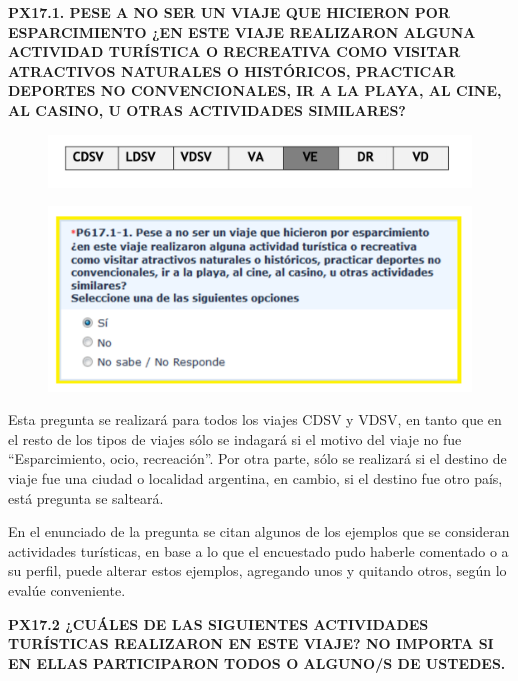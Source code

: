 \documentclass[
  openany]{book}
\begin{document}
\textbf{PX17.1. PESE A NO SER UN VIAJE QUE HICIERON POR ESPARCIMIENTO ¿EN ESTE VIAJE REALIZARON ALGUNA ACTIVIDAD TURÍSTICA O RECREATIVA COMO VISITAR ATRACTIVOS NATURALES O HISTÓRICOS, PRACTICAR DEPORTES NO CONVENCIONALES, IR A LA PLAYA, AL CINE, AL CASINO, U OTRAS ACTIVIDADES SIMILARES?}

\begin{figure}

{\centering \includegraphics[width=1\linewidth]{imagenes/figura6-111} 

}

\end{figure}

\begin{figure}

{\centering \includegraphics[width=1\linewidth]{imagenes/figura6-112} 

}

\end{figure}

Esta pregunta se realizará para todos los viajes CDSV y VDSV, en tanto que en el resto de los tipos de viajes sólo se indagará si el motivo del viaje no fue ``Esparcimiento, ocio, recreación''. Por otra parte, sólo se realizará si el destino de viaje fue una ciudad o localidad argentina, en cambio, si el destino fue otro país, está pregunta se salteará.

En el enunciado de la pregunta se citan algunos de los ejemplos que se consideran actividades turísticas, en base a lo que el encuestado pudo haberle comentado o a su perfil, puede alterar estos ejemplos, agregando unos y quitando otros, según lo evalúe conveniente.

\textbf{PX17.2 ¿CUÁLES DE LAS SIGUIENTES ACTIVIDADES TURÍSTICAS REALIZARON EN ESTE VIAJE? NO IMPORTA SI EN ELLAS PARTICIPARON TODOS O ALGUNO/S DE USTEDES.}
\end{document}
